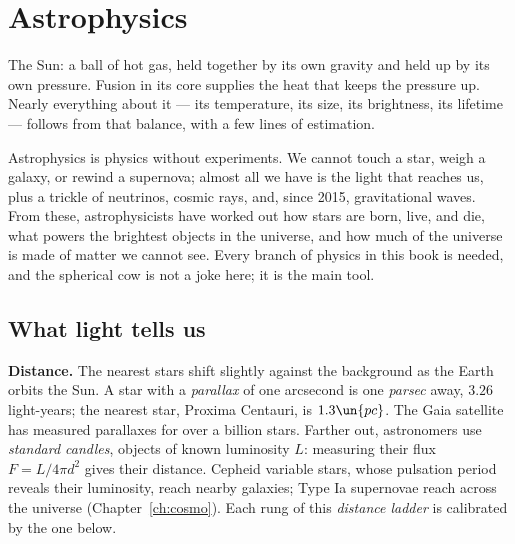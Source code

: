 \chapter{Astrophysics}
\label{ch:astro}



\begin{prototype}
The Sun: a ball of hot gas, held together by its own gravity and held up by its own pressure. Fusion in its core supplies the heat that keeps the pressure up. Nearly everything about it --- its temperature, its size, its brightness, its lifetime --- follows from that balance, with a few lines of estimation.
\end{prototype}

Astrophysics is physics without experiments. We cannot touch a star, weigh a galaxy, or rewind a supernova; almost all we have is the light that reaches us, plus a trickle of neutrinos, cosmic rays, and, since 2015, gravitational waves. From these, astrophysicists have worked out how stars are born, live, and die, what powers the brightest objects in the universe, and how much of the universe is made of matter we cannot see. Every branch of physics in this book is needed, and the spherical cow is not a joke here; it is the main tool.

\section{What light tells us}

\textbf{Distance.} The nearest stars shift slightly against the background as the Earth orbits the Sun. A star with a \emph{parallax} of one arcsecond is one \emph{parsec} away, $3.26$ light-years; the nearest star, Proxima Centauri, is $1.3\un{pc}$. The Gaia satellite has measured parallaxes for over a billion stars. Farther out, astronomers use \emph{standard candles}, objects of known luminosity $L$: measuring their flux $F = L/4\pi d^2$ gives their distance. Cepheid variable stars, whose pulsation period reveals their luminosity, reach nearby galaxies; Type Ia supernovae reach across the universe (Chapter~\ref{ch:cosmo}). Each rung of this \emph{distance ladder} is calibrated by the one below.

